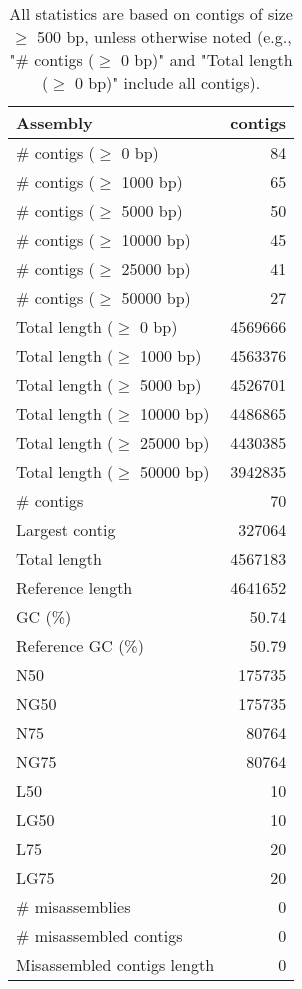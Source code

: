 \documentclass[12pt,a4paper]{article}
\begin{document}
\begin{table}[ht]
\begin{center}
\caption{All statistics are based on contigs of size $\geq$ 500 bp, unless otherwise noted (e.g., "\# contigs ($\geq$ 0 bp)" and "Total length ($\geq$ 0 bp)" include all contigs).}
\begin{tabular}{|l*{1}{|r}|}
\hline
Assembly & contigs \\ \hline
\# contigs ($\geq$ 0 bp) & 84 \\ \hline
\# contigs ($\geq$ 1000 bp) & 65 \\ \hline
\# contigs ($\geq$ 5000 bp) & 50 \\ \hline
\# contigs ($\geq$ 10000 bp) & 45 \\ \hline
\# contigs ($\geq$ 25000 bp) & 41 \\ \hline
\# contigs ($\geq$ 50000 bp) & 27 \\ \hline
Total length ($\geq$ 0 bp) & 4569666 \\ \hline
Total length ($\geq$ 1000 bp) & 4563376 \\ \hline
Total length ($\geq$ 5000 bp) & 4526701 \\ \hline
Total length ($\geq$ 10000 bp) & 4486865 \\ \hline
Total length ($\geq$ 25000 bp) & 4430385 \\ \hline
Total length ($\geq$ 50000 bp) & 3942835 \\ \hline
\# contigs & 70 \\ \hline
Largest contig & 327064 \\ \hline
Total length & 4567183 \\ \hline
Reference length & 4641652 \\ \hline
GC (\%) & 50.74 \\ \hline
Reference GC (\%) & 50.79 \\ \hline
N50 & 175735 \\ \hline
NG50 & 175735 \\ \hline
N75 & 80764 \\ \hline
NG75 & 80764 \\ \hline
L50 & 10 \\ \hline
LG50 & 10 \\ \hline
L75 & 20 \\ \hline
LG75 & 20 \\ \hline
\# misassemblies & 0 \\ \hline
\# misassembled contigs & 0 \\ \hline
Misassembled contigs length & 0 \\ \hline

\end{tabular}
\end{center}
\end{table}
\end{document}
